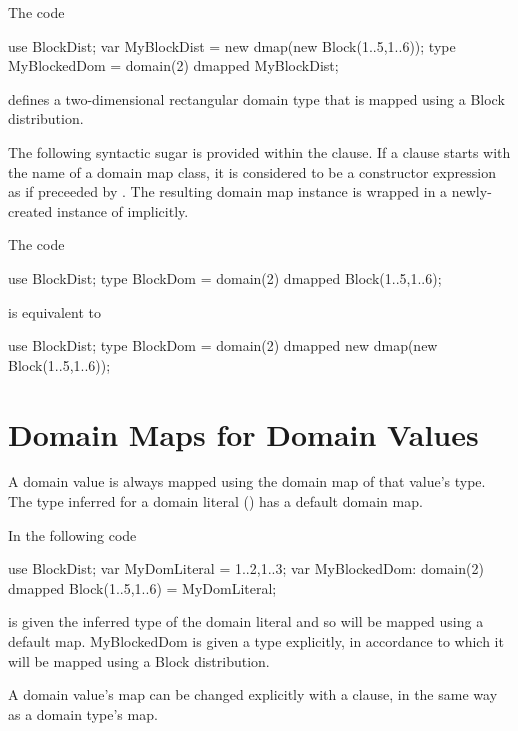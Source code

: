 \begin{example}
The code
\begin{chapel}
use BlockDist;
var MyBlockDist = new dmap(new Block({1..5,1..6}));
type MyBlockedDom = domain(2) dmapped MyBlockDist;
\end{chapel}
defines a two-dimensional rectangular domain type
that is mapped using a Block distribution.
\end{example}

The following syntactic sugar is provided within the  clause.
If a  clause starts with the name of a domain map class,
it is considered to be a constructor expression as if preceeded by
. The resulting domain map instance is wrapped in a newly-created
instance of  implicitly.

\begin{example}
The code
\begin{chapel}
use BlockDist;
type BlockDom = domain(2) dmapped Block({1..5,1..6});
\end{chapel}
is equivalent to
\begin{chapel}
use BlockDist;
type BlockDom = domain(2) dmapped new dmap(new Block({1..5,1..6}));
\end{chapel}
\end{example}


\section{Domain Maps for Domain Values}
\label{Domain_Maps_For_Values}

A domain value is always mapped using the domain map of that value's type.
The type inferred for a domain literal ()
has a default domain map.

\begin{example}
In the following code
\begin{chapel}
use BlockDist;
var MyDomLiteral = {1..2,1..3};
var MyBlockedDom: domain(2) dmapped Block({1..5,1..6}) = MyDomLiteral;
\end{chapel}
 is given the inferred type of the domain literal
and so will be mapped using a default map.
MyBlockedDom is given a type explicitly, in accordance to which
it will be mapped using a Block distribution.
\end{example}

A domain value's map can be changed explicitly with a  clause,
in the same way as a domain type's map.

